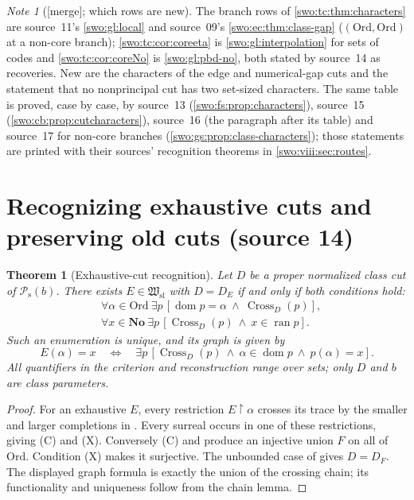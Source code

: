 \documentclass[11pt]{article}
\newtheorem{theorem}{Theorem}[section]
\theoremstyle{definition}
\theoremstyle{remark}
\newtheorem{note}[note]{Note}
\newcommand{\No}{\mathbf{No}}
\newcommand{\Ord}{\mathrm{Ord}}
\newcommand{\Hsl}{\mathfrak W_{\mathrm{sl}}}
\newcommand{\Psupp}{\mathcal P_{\mathrm{s}}}
\newcommand{\ran}{\operatorname{ran}}
\newcommand{\dom}{\operatorname{dom}}
\newcommand{\res}{\mathbin{\upharpoonright}}
\newcommand{\merge}{\textsf{[merge]}}
\begin{document}
\begin{note}[\merge; which rows are new]\label{swo:viii:note:characters}
The branch rows of \cref{swo:tc:thm:characters} are source~11's
\cref{swo:gl:local} and source~09's \cref{swo:ec:thm:class-gap}
($(\Ord,\Ord)$ at a non-core branch); \cref{swo:tc:cor:coreeta} is
\cref{swo:gl:interpolation} for sets of codes and \cref{swo:tc:cor:coreNo} is
\cref{swo:gl:pbd-no}, both stated by source~14 as recoveries. New are the
characters of the edge and numerical-gap cuts and the statement that no
nonprincipal cut has two set-sized characters. The same table is proved,
case by case, by source~13 (\cref{swo:fs:prop:characters}), source~15
(\cref{swo:cb:prop:cutcharacters}), source~16 (the paragraph after its
table) and source~17 for non-core branches (\cref{swo:gs:prop:class-characters});
those statements are printed with their sources' recognition theorems in
\cref{swo:viii:sec:routes}.
\end{note}

\section{Recognizing exhaustive cuts and preserving old cuts (source 14)}
\label{swo:tc:sec:recognition}
\begin{theorem}[Exhaustive-cut recognition]\label{swo:tc:thm:recognition}
Let $D$ be a proper normalized class cut of $\Psupp(b)$. There exists
$E\in \Hsl$ with $D=D_E$ if and only if both conditions hold:
\begin{align}
 &\forall\alpha\in\Ord\ \exists p\,
   [\dom p=\alpha\ \wedge\ \operatorname{Cross}_D(p)],
       \tag{C}\label{swo:tc:eq:coherence}\\
 &\forall x\in\No\ \exists p\,
   [\operatorname{Cross}_D(p)\ \wedge\ x\in\ran p].
       \tag{X}\label{swo:tc:eq:coverage}
\end{align}
Such an enumeration is unique, and its graph is given by
\[
 E(\alpha)=x\quad\Longleftrightarrow\quad
 \exists p\,[\operatorname{Cross}_D(p)\ \wedge\ \alpha\in\dom p
                         \ \wedge\ p(\alpha)=x].
\]
All quantifiers in the criterion and reconstruction range over sets;
only $D$ and $b$ are class parameters.
\end{theorem}
\begin{proof}
For an exhaustive $E$, every restriction $E\res\alpha$ crosses its
trace by the smaller and larger completions in
. Every surreal occurs in one of these
restrictions, giving (C) and (X). Conversely (C) and
 produce an injective union $F$ on all of
$\Ord$. Condition (X) makes it surjective. The unbounded case of
 gives $D=D_F$. The displayed graph formula
is exactly the union of the crossing chain; its functionality and
uniqueness follow from the chain lemma.
\end{proof}
\end{document}
